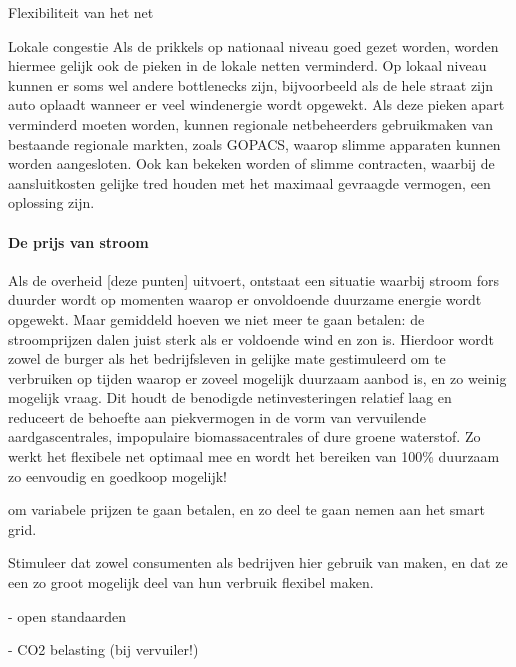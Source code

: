 \begin{voorstel}{Flexibiliteit van het net}
\begin{multicols}{2}
\begin{overwegingen}
\begin{infobox}{Lokale congestie}
Als de prikkels op nationaal niveau goed gezet worden, worden hiermee gelijk ook de pieken in de lokale netten verminderd. Op lokaal niveau kunnen er soms wel andere bottlenecks zijn, bijvoorbeeld als de hele straat zijn auto oplaadt wanneer er veel windenergie wordt opgewekt. Als deze pieken apart verminderd moeten worden, kunnen regionale netbeheerders gebruikmaken van bestaande regionale markten, zoals GOPACS, waarop slimme apparaten kunnen worden aangesloten. Ook kan bekeken worden of slimme contracten, waarbij de aansluitkosten gelijke tred houden met het maximaal gevraagde vermogen, een oplossing zijn.
\end{infobox}

\paragraph{De prijs van stroom}
Als de overheid [deze punten] uitvoert, ontstaat een situatie waarbij stroom fors duurder wordt op momenten waarop er onvoldoende duurzame energie wordt opgewekt. Maar gemiddeld hoeven we niet meer te gaan betalen: de stroomprijzen dalen juist sterk als er voldoende wind en zon is. Hierdoor wordt zowel de burger als het bedrijfsleven in gelijke mate gestimuleerd om te verbruiken op tijden waarop er zoveel mogelijk duurzaam aanbod is, en zo weinig mogelijk vraag. Dit houdt de benodigde netinvesteringen relatief laag en reduceert de behoefte aan piekvermogen in de vorm van vervuilende aardgascentrales, impopulaire biomassacentrales of dure groene waterstof. Zo werkt het flexibele net optimaal mee en wordt het bereiken van 100\% duurzaam zo eenvoudig en goedkoop mogelijk!


\end{overwegingen}

\begin{aanbevelingen}
 om variabele prijzen te gaan betalen, en zo deel te gaan nemen aan het smart grid.

Stimuleer dat zowel consumenten als bedrijven hier gebruik van maken, en dat ze een zo groot mogelijk deel van hun verbruik flexibel maken.

- open standaarden


- CO2 belasting (bij vervuiler!)


\end{aanbevelingen}
\end{multicols}
\end{voorstel}
